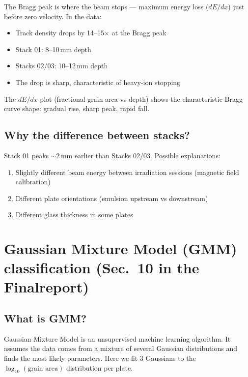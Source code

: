 \documentclass[12pt,a4paper]{article}
\begin{document}
The Bragg peak is where the beam stops --- maximum energy loss
($dE/dx$) just before zero velocity. In the data:

\begin{itemize}
  \item Track density drops by 14--15$\times$ at the Bragg peak
  \item Stack 01: 8--10\,mm depth
  \item Stacks 02/03: 10--12\,mm depth
  \item The drop is sharp, characteristic of heavy-ion stopping
\end{itemize}

The $dE/dx$ plot (fractional grain area vs depth) shows the
characteristic Bragg curve shape: gradual rise, sharp peak,
rapid fall.

\subsection{Why the difference between stacks?}

Stack 01 peaks $\sim$2\,mm earlier than Stacks 02/03. Possible
explanations:
\begin{enumerate}
  \item Slightly different beam energy between irradiation sessions
        (magnetic field calibration)
  \item Different plate orientations (emulsion upstream vs downstream)
  \item Different glass thickness in some plates
\end{enumerate}

\section{Gaussian Mixture Model (GMM) classification (Sec.~10 in the Finalreport)}

\subsection{What is GMM?}

Gaussian Mixture Model is an unsupervised machine learning algorithm.
It assumes the data comes from a mixture of several Gaussian
distributions and finds the most likely parameters. Here we fit 3
Gaussians to the $\log_{10}(\text{grain area})$ distribution per plate.
\end{document}
